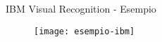 %
\begin{frame}[t]{IBM Visual Recognition - Esempio}
	\begin{figure}[h]
	\centering
	    \texttt{[image: esempio-ibm]}
		\label{fig:esempio-ibm}
	\end{figure}
\end{frame}
%

